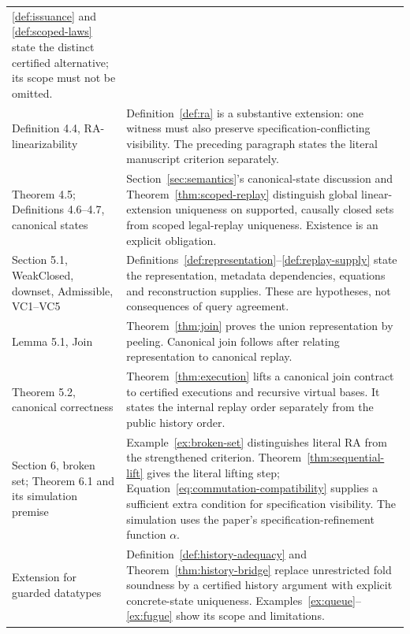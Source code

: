 \begin{longtable}{@{}>{\raggedright\arraybackslash}p{}>{\raggedright\arraybackslash}p{}@{}}
\ref{def:issuance} and \ref{def:scoped-laws} state the distinct certified
alternative; its scope must not be omitted. \\[5pt]
Definition 4.4, RA-linearizability &
Definition~\ref{def:ra} is a substantive extension: one witness must also
preserve specification-conflicting visibility. The preceding paragraph
states the literal manuscript criterion separately. \\[5pt]
Theorem 4.5; Definitions 4.6--4.7, canonical states &
Section~\ref{sec:semantics}'s canonical-state discussion and
Theorem~\ref{thm:scoped-replay} distinguish global linear-extension uniqueness
on supported, causally closed sets from scoped legal-replay uniqueness.
Existence is an explicit obligation. \\[5pt]
Section 5.1, WeakClosed, downset, Admissible, VC1--VC5 &
Definitions~\ref{def:representation}--\ref{def:replay-supply} state the
representation, metadata dependencies, equations and reconstruction supplies.
These are hypotheses, not consequences of query agreement. \\[5pt]
Lemma 5.1, Join &
Theorem~\ref{thm:join} proves the union representation by peeling.
Canonical join follows after relating representation to canonical replay. \\[5pt]
Theorem 5.2, canonical correctness &
Theorem~\ref{thm:execution} lifts a canonical join contract to certified
executions and recursive virtual bases. It states the internal replay order
separately from the public history order. \\[5pt]
Section 6, broken set; Theorem 6.1 and its simulation premise &
Example~\ref{ex:broken-set} distinguishes literal RA from the strengthened
criterion. Theorem~\ref{thm:sequential-lift} gives the literal lifting step;
Equation~\eqref{eq:commutation-compatibility} supplies a sufficient extra
condition for specification visibility. The simulation uses the paper's
specification-refinement function $\alpha$. \\[5pt]
Extension for guarded datatypes &
Definition~\ref{def:history-adequacy} and Theorem~\ref{thm:history-bridge}
replace unrestricted fold soundness by a certified history argument with
explicit concrete-state uniqueness. Examples~\ref{ex:queue}--\ref{ex:fugue} show its
scope and limitations. \\
\bottomrule
\end{longtable}

